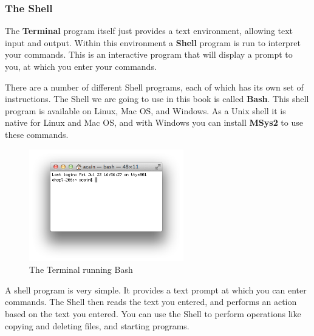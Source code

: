 \clearpage
\subsubsection{The Shell} %
\label{ssub:the_shell}

The \textbf{Terminal} program itself just provides a text environment, allowing text input and output. Within this environment a \textbf{Shell} program is run to interpret your commands. This is an interactive program that will display a prompt to you, at which you enter your commands.

There are a number of different Shell programs, each of which has its own set of instructions. The Shell we are going to use in this book is called \textbf{Bash}. This shell program is available on Linux, Mac OS, and Windows. As a Unix shell it is native for Linux and Mac OS, and with Windows you can install \textbf{MSys2} to use these commands.

\begin{figure}[h]
   \centering
   \includegraphics[width=0.6\textwidth]{./topics/programs-and-compilers/images/Bash} 
   \caption{The Terminal running Bash}
   \label{fig:bash}
\end{figure}

A shell program is very simple. It provides a text prompt at which you can enter commands. The Shell then reads the text you entered, and performs an action based on the text you entered. You can use the Shell to perform operations like copying and deleting files, and starting programs.


